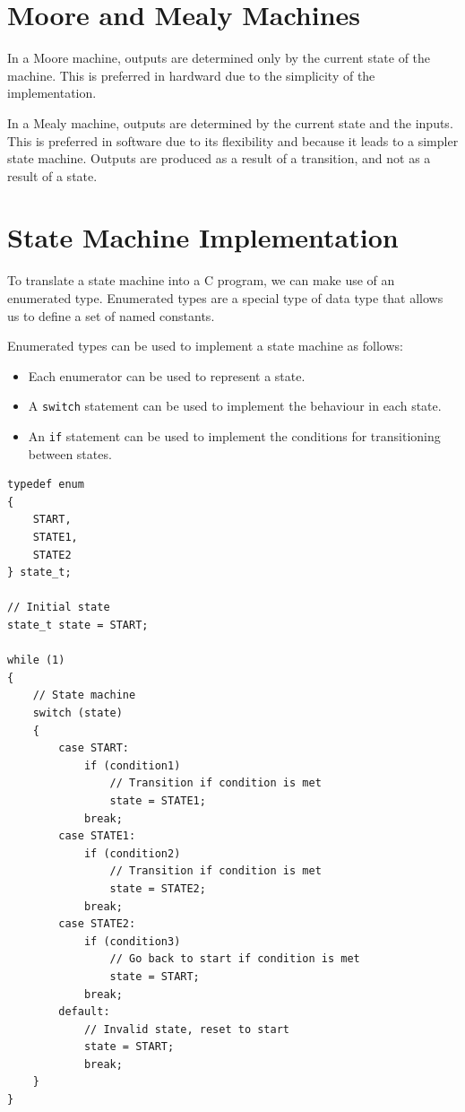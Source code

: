 \documentclass[a4paper]{report}
\begin{document}
\section{Moore and Mealy Machines}
In a Moore machine, outputs are determined only by the current state of the machine.
This is preferred in hardward due to the simplicity of the implementation.

In a Mealy machine, outputs are determined by the current state and the inputs.
This is preferred in software due to its flexibility and because it leads to a simpler state machine.
Outputs are produced as a result of a transition, and not as a result of a state.
\section{State Machine Implementation}
To translate a state machine into a C program, we can make use of an enumerated type.
Enumerated types are a special type of data type that allows us to define a set of named constants.

Enumerated types can be used to implement a state machine as follows:
\begin{itemize}
    \item Each enumerator can be used to represent a state.
    \item A \texttt{switch} statement can be used to implement the behaviour in each state.
    \item An \texttt{if} statement can be used to implement the conditions for transitioning between states.
\end{itemize}
\begin{verbatim}
typedef enum
{
    START,
    STATE1,
    STATE2
} state_t;

// Initial state
state_t state = START;

while (1)
{
    // State machine
    switch (state)
    {
        case START:
            if (condition1)
                // Transition if condition is met
                state = STATE1;
            break;
        case STATE1:
            if (condition2)
                // Transition if condition is met
                state = STATE2;
            break;
        case STATE2:
            if (condition3)
                // Go back to start if condition is met
                state = START;
            break;
        default:
            // Invalid state, reset to start
            state = START;
            break;
    }
}
\end{verbatim}
\end{document}
